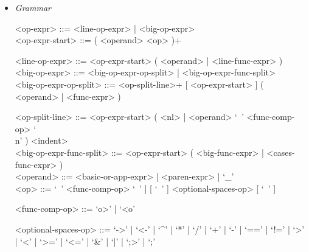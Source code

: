\documentclass{article}
\begin{document}
\begin{itemize}
\begin{verbatim}
"Hello, I'm a big string that's going to contain multiple values from " +
"inside the imaginary program that I'm a part of. Here they are:\n" +
"value1 = " + value1 + ", value2 = " + value2 + ", value3 = " + value3 +
", value4 = " + value4 + ", value5 = " + value5
\end{verbatim}

\textbf{Description}

It is possible to stretch a (big) operator expression over multiple lines.
In that case:
\begin{itemize}
\item
The operator expression must split in a new line after an operator (not an
argument).

\item
Every line after the first must be indented so that in begins at the column
where the first line of the operator expression begun.

\item
The precise indentation rules are described in the section
"Indentation System" \ref{subsubsec:indsys}.
\end{itemize}

\item \textit{Grammar}
\begin{grammar}
<op-expr> ::= <line-op-expr> | <big-op-expr>
\\

<op-expr-start> ::= ( <operand> <op> )+

<line-op-expr> ::= <op-expr-start> ( <operand> | <line-func-expr> )
\\

<big-op-expr> ::=
<big-op-expr-op-split> | <big-op-expr-func-split>
\\

<big-op-expr-op-split> ::=
<op-split-line>+ [ <op-expr-start> ] ( <operand> | <func-expr> )

<op-split-line> ::=
<op-expr-start> ( <nl> | <operand> `\ ' <func-comp-op> `\\n' ) <indent>
\\

<big-op-expr-func-split> ::=
<op-expr-start> ( <big-func-expr> | <cases-func-expr> )
\\

<operand> ::= <basic-or-app-expr> | <paren-expr> | `_'
\\

<op> ::= `\ ' <func-comp-op> `\ ' | [ `\ ' ] <optional-spaces-op> [ `\ ' ]

<func-comp-op> ::= `o>' | `<o'

<optional-spaces-op> ::=
`->' | `<-' | `^' | `*' | `/' | `+' | `-' | `==' | `!=' | `>' | `<' | `>=' |
`<=' | `\&' | `|' | `;>' | `;'
\end{grammar}
\end{itemize}
\end{document}
